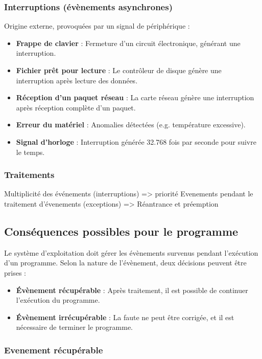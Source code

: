 \subsubsection{Interruptions (évènements asynchrones)}
Origine externe, provoquées par un signal de périphérique :
\begin{itemize}
    \item \textbf{Frappe de clavier} : Fermeture d’un circuit électronique, générant une interruption.
    \item \textbf{Fichier prêt pour lecture} : Le contrôleur de disque génère une interruption après lecture des données.
    \item \textbf{Réception d’un paquet réseau} : La carte réseau génère une interruption après réception complète d’un paquet.
    \item \textbf{Erreur du matériel} : Anomalies détectées (e.g. température excessive).
    \item \textbf{Signal d’horloge} : Interruption générée 32.768 fois par seconde pour suivre le temps.
\end{itemize}

\subsubsection{Traitements}
Multiplicité des événements (interruptions) => priorité
Evenements pendant le traitement d'évenements (exceptions) => Réantrance et préemption


\subsection{Conséquences possibles pour le programme}

Le système d'exploitation doit gérer les évènements survenus pendant l'exécution d'un programme. 
Selon la nature de l'évènement, deux décisions peuvent être prises :

\begin{itemize}
    \item \textbf{Évènement récupérable} : Après traitement, il est possible de continuer l'exécution du programme.
    \item \textbf{Évènement irrécupérable} : La faute ne peut être corrigée, et il est nécessaire de terminer le programme.
\end{itemize}

\subsubsection{Evenement récupérable}

